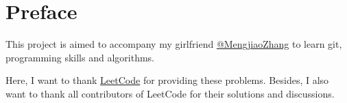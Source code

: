 \chapter{Preface}
\label{ch:preface}
This project is aimed to accompany my girlfriend \href{https://github.com/mengjiaozhang}{@MengjiaoZhang} to learn git, programming skills and algorithms.

Here, I want to thank \href{https://leetcode.com/}{LeetCode} for providing these problems. Besides, I also want to thank all contributors of LeetCode for their solutions and discussions.
